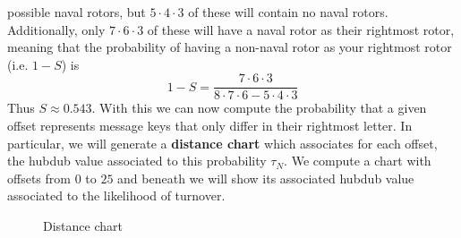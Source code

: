 possible naval rotors, but $5\cdot4\cdot3$ of these will contain no
naval rotors. Additionally, only $7\cdot6\cdot3$ of these will have
a naval rotor as their rightmost rotor, meaning that the
probability of having a non-naval rotor as your rightmost rotor (i.e. $1-S$) is
\[
	1-S = \frac{7\cdot6\cdot3}{8\cdot7\cdot6 - 5\cdot4\cdot3}
\]
Thus $S\approx0.543$. With this we can now compute the probability
that a given offset represents message keys that only differ in
their rightmost letter. In particular, we will generate a
	{\bf{distance chart}} which associates for each offset, the hubdub
value associated to this probability $\tau_N$. We compute a chart
with offsets from $0$ to $25$ and beneath we will show its
associated hubdub value associated to the likelihood of turnover.
\begin{figure}[H]
	\begin{center}
	\end{center}
	\caption{Distance chart}
	\label{fig:distance_chart}
\end{figure}

